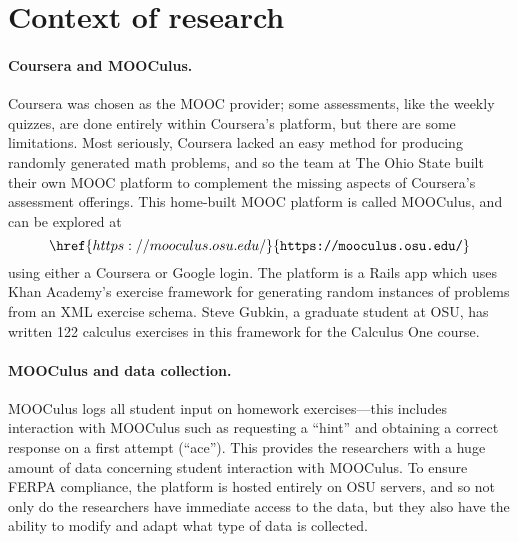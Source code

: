 \documentclass[12pt]{article}
\begin{document}
\section{Context of research}

\paragraph{Coursera and MOOCulus.} 
Coursera was chosen as the MOOC provider; some assessments, like the
weekly quizzes, are done entirely within Coursera's platform, but
there are some limitations.  Most seriously, Coursera lacked an easy
method for producing randomly generated math problems, and so the team
at The Ohio State built their own MOOC platform to complement the
missing aspects of Coursera's assessment offerings.  This home-built
MOOC platform is called MOOCulus, and can be explored at
\[
\href{https://mooculus.osu.edu/}{\texttt{https://mooculus.osu.edu/}}
\]
using either a Coursera or Google login.  The platform is a Rails app
which uses Khan Academy's exercise framework for generating random
instances of problems from an XML exercise schema.  Steve Gubkin, a
graduate student at OSU, has written 122 calculus exercises in this
framework for the Calculus One course.

\paragraph{MOOCulus and data collection.} 
MOOCulus logs all student input on homework exercises---this includes
interaction with MOOCulus such as requesting a ``hint'' and obtaining
a correct response on a first attempt (``ace'').  This provides the
researchers with a huge amount of data concerning student interaction
with MOOCulus.  To ensure FERPA compliance, the platform is hosted
entirely on OSU servers, and so not only do the researchers have
immediate access to the data, but they also have the ability to modify
and adapt what type of data is collected.
\end{document}
